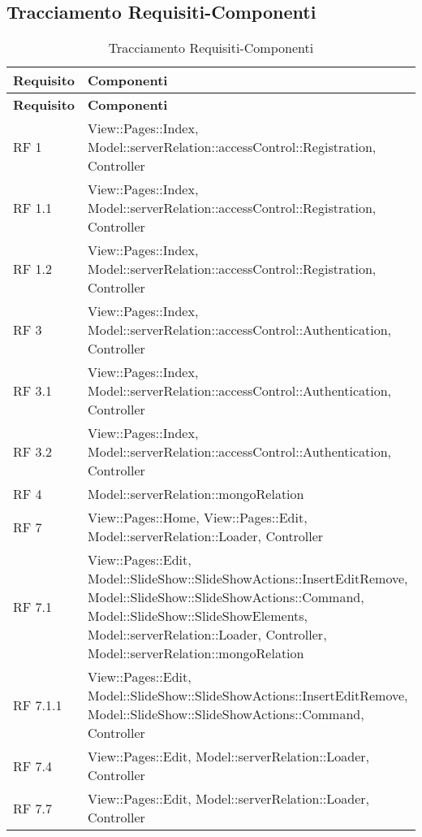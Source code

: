 \subsection{Tracciamento Requisiti-Componenti}{ 
\renewcommand*{\arraystretch}{1.4} 
\begin{longtable} [c]{| p{2cm} | p{13cm} |} 
\caption{Tracciamento Requisiti-Componenti \label{tab:traccReqComp}}\\ \hline\textbf{Requisito} & \textbf{Componenti} \\ 
\hline \endfirsthead \hline 
\textbf{Requisito} & \textbf{Componenti} \\ 
\hline \endhead \hline \endfoot \hline \endlastfoot 
RF 1 & View::\-Pages::\-Index, Model::\-serverRelation::\-accessControl::\-Registration, Controller\\ 
 \hline 
RF 1.1 & View::\-Pages::\-Index, Model::\-serverRelation::\-accessControl::\-Registration, Controller\\ 
 \hline 
RF 1.2 & View::\-Pages::\-Index, Model::\-serverRelation::\-accessControl::\-Registration, Controller\\ 
 \hline 
RF 3 & View::\-Pages::\-Index, Model::\-serverRelation::\-accessControl::\-Authentication, Controller\\ 
 \hline 
RF 3.1 & View::\-Pages::\-Index, Model::\-serverRelation::\-accessControl::\-Authentication, Controller\\ 
 \hline 
RF 3.2 & View::\-Pages::\-Index, Model::\-serverRelation::\-accessControl::\-Authentication, Controller\\ 
 \hline 
RF 4 & Model::\-serverRelation::\-mongoRelation\\ 
 \hline 
RF 7 & View::\-Pages::\-Home, View::\-Pages::\-Edit, Model::\-serverRelation::\-Loader, Controller\\ 
 \hline 
RF 7.1 & View::\-Pages::\-Edit, Model::\-SlideShow::\-SlideShowActions::\-InsertEditRemove, Model::\-SlideShow::\-SlideShowActions::\-Command, Model::\-SlideShow::\-SlideShowElements, Model::\-serverRelation::\-Loader, Controller, Model::\-serverRelation::\-mongoRelation\\ 
 \hline 
RF 7.1.1 & View::\-Pages::\-Edit, Model::\-SlideShow::\-SlideShowActions::\-InsertEditRemove, Model::\-SlideShow::\-SlideShowActions::\-Command, Controller\\ 
 \hline 
RF 7.4 & View::\-Pages::\-Edit, Model::\-serverRelation::\-Loader, Controller\\ 
 \hline 
RF 7.7 & View::\-Pages::\-Edit, Model::\-serverRelation::\-Loader, Controller\\ 

\end{longtable}}
